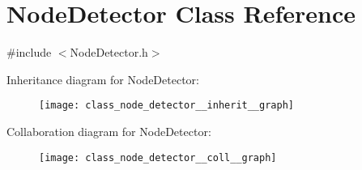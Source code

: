 \hypertarget{class_node_detector}{}\section{Node\+Detector Class Reference}
\label{class_node_detector}


{\ttfamily \#include $<$Node\+Detector.\+h$>$}



Inheritance diagram for Node\+Detector\+:
\nopagebreak
\begin{figure}[H]
\begin{center}
\leavevmode
\texttt{[image: class\_node\_detector\_\_inherit\_\_graph]}
\end{center}
\end{figure}


Collaboration diagram for Node\+Detector\+:
\nopagebreak
\begin{figure}[H]
\begin{center}
\leavevmode
\texttt{[image: class\_node\_detector\_\_coll\_\_graph]}
\end{center}
\end{figure}
